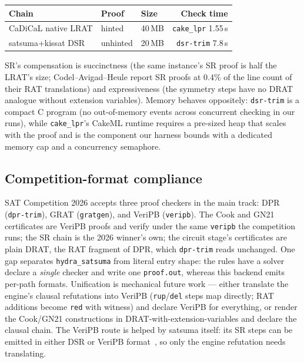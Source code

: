 \documentclass[10pt]{article}
\begin{document}
\begin{center}
\begin{tabular}{@{}lllr@{}}
\toprule
Chain & Proof & Size & Check time \\
\midrule
CaDiCaL native LRAT & hinted & 40\,MB & \texttt{cake\_lpr} 1.55\,s \\
satsuma+kissat DSR & unhinted & 20\,MB & \texttt{dsr-trim} 7.8\,s \\
\bottomrule
\end{tabular}
\end{center}

SR's compensation is succinctness (the same instance's SR proof is
half the LRAT's size; Codel--Avigad--Heule report SR proofs at 0.4\%
of the line count of their RAT translations) and expressiveness (the
symmetry steps have no DRAT analogue without extension variables).
Memory behaves oppositely: \texttt{dsr-trim} is a compact C program
(no out-of-memory events across concurrent checking in our runs),
while \texttt{cake\_lpr}'s CakeML runtime requires a pre-sized heap
that scales with the proof and is the component our harness bounds
with a dedicated memory cap and a concurrency semaphore.

\subsection{Competition-format compliance}
\label{sec:compliance}

SAT Competition 2026 accepts three proof checkers in the main track:
DPR (\texttt{dpr-trim}), GRAT (\texttt{gratgen}), and VeriPB
(\texttt{veripb}). The Cook and GN21 certificates are VeriPB proofs
and verify under the same \texttt{veripb} the competition runs; the SR
chain is the 2026 winner's own; the circuit stage's certificates are
plain DRAT, the RAT fragment of DPR, which \texttt{dpr-trim} reads
unchanged. One gap separates
\texttt{hydra\_satsuma} from literal entry shape: the rules have a
solver declare a \emph{single} checker and write one
\texttt{proof.out}, whereas this backend emits per-path formats.
Unification is mechanical future work --- either translate the
engine's clausal refutations into VeriPB (\texttt{rup}/\texttt{del}
steps map directly; RAT additions become \texttt{red} with witness)
and declare VeriPB for everything, or render the Cook/GN21
constructions in DRAT-with-extension-variables and declare the
clausal chain. The VeriPB route is helped by satsuma itself: its SR
steps can be emitted in either DSR or VeriPB format~\cite{sbr}, so
only the engine refutation needs translating.
\end{document}
